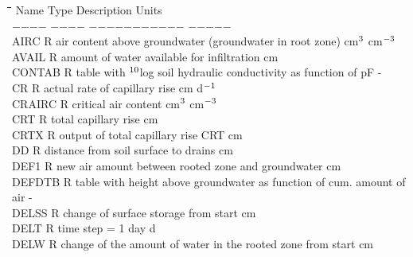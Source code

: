 \begin{tabbing}
\hspace{1.27cm}\=\hspace{1.27cm}\=\hspace{1.27cm}\=\hspace{1.27cm}\=%
\hspace{1.27cm}\=\hspace{1.27cm}\=\hspace{1.27cm}\=\hspace{1.27cm}\=%
\hspace{1.27cm}\=\hspace{1.27cm}\=\kill
Name    \> \> Type   \> Description                                        \> \> \> \> \> \> \> Units\\
$-$$-$$-$$-$    \> \> $-$$-$$-$$-$   \> $-$$-$$-$$-$$-$$-$$-$$-$$-$$-$$-$                                        \> \> \> \> \> \> \> $-$$-$$-$$-$$-$\\
AIRC\> \> R\> air content above groundwater (groundwater in root zone)\> \> \> \> \> \> \> cm$^{{\rm 3}}$ cm$^{{\rm -3}}$\\
AVAIL\> \> R\> amount of water available for infiltration\> \> \> \> \> \> \> cm\\
CONTAB\> \> R\> table with $^{{\rm 10}}$log soil hydraulic conductivity as function of pF \> \> \> \> \> \> \> -\\
CR\> \> R\> actual rate of capillary rise\> \> \> \> \> \> \> cm d$^{{\rm -1}}$\\
CRAIRC\> \> R\> critical air content\> \> \> \> \> \> \> cm$^{{\rm 3}}$ cm$^{{\rm -3}}$\\
CRT\> \> R\> total capillary rise\> \> \> \> \> \> \> cm\\
CRTX\> \> R\> output of total capillary rise CRT\> \> \> \> \> \> \> cm\\
DD\> \> R\> distance from soil surface to drains\> \> \> \> \> \> \> cm\\
DEF1\> \> R\> new air amount between rooted zone and groundwater\> \> \> \> \> \> \> cm\\
DEFDTB\> \> R\> table with height above groundwater as function of cum. amount of air\> \> \> \> \> \> \> -\\
DELSS\> \> R\> change of surface storage from start\> \> \> \> \> \> \> cm\\
DELT\> \> R\> time step = 1 day\> \> \> \> \> \> \> d\\
DELW\> \> R\> change of the amount of water in the rooted zone from start\> \> \> \> \> \> \> cm\\

\end{tabbing}

